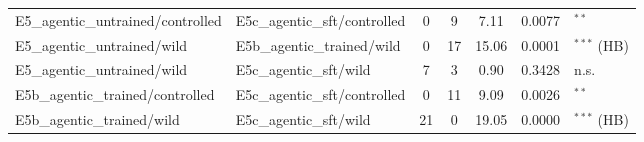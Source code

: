 \begin{table}[t]
\begin{tabular}{llccccl}
E5\_agentic\_untrained/controlled & E5c\_agentic\_sft/controlled & 0 & 9 & 7.11 & 0.0077 & $^{**}$ \\
E5\_agentic\_untrained/wild & E5b\_agentic\_trained/wild & 0 & 17 & 15.06 & 0.0001 & $^{***}$ (HB) \\
E5\_agentic\_untrained/wild & E5c\_agentic\_sft/wild & 7 & 3 & 0.90 & 0.3428 & n.s. \\
E5b\_agentic\_trained/controlled & E5c\_agentic\_sft/controlled & 0 & 11 & 9.09 & 0.0026 & $^{**}$ \\
E5b\_agentic\_trained/wild & E5c\_agentic\_sft/wild & 21 & 0 & 19.05 & 0.0000 & $^{***}$ (HB) \\
\bottomrule
\end{tabular}
\end{table}
